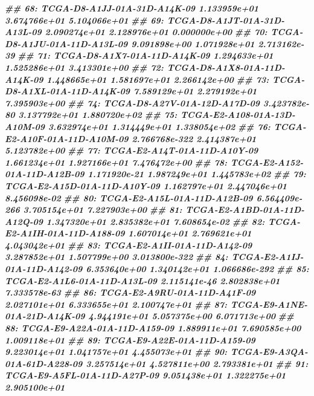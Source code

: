 \documentclass[
  12pt,
  a4paper,
  twoside]{book}
\newenvironment{Shaded}{\begin{snugshade}}{\end{snugshade}}
\newcommand{\DocumentationTok}[1]{\textcolor[rgb]{0.56,0.35,0.01}{\textbf{\textit{#1}}}}
\begin{document}
\begin{Shaded}
\begin{Highlighting}[]
\DocumentationTok{\#\#  68: TCGA{-}D8{-}A1JJ{-}01A{-}31D{-}A14K{-}09  1.133959e+01  3.674766e+01  5.104066e+01}
\DocumentationTok{\#\#  69: TCGA{-}D8{-}A1JT{-}01A{-}31D{-}A13L{-}09  2.090274e+01  2.128976e+01  0.000000e+00}
\DocumentationTok{\#\#  70: TCGA{-}D8{-}A1JU{-}01A{-}11D{-}A13L{-}09  9.091898e+00  1.071928e+01  2.713162e{-}39}
\DocumentationTok{\#\#  71: TCGA{-}D8{-}A1X7{-}01A{-}11D{-}A14K{-}09  1.294633e+01  1.525286e+01  3.413301e+00}
\DocumentationTok{\#\#  72: TCGA{-}D8{-}A1X8{-}01A{-}11D{-}A14K{-}09  1.448665e+01  1.581697e+01  2.266142e+00}
\DocumentationTok{\#\#  73: TCGA{-}D8{-}A1XL{-}01A{-}11D{-}A14K{-}09  7.589129e+01  2.279192e+01  7.395903e+00}
\DocumentationTok{\#\#  74: TCGA{-}D8{-}A27V{-}01A{-}12D{-}A17D{-}09  3.423782e{-}80  3.137792e+01  1.880720e+02}
\DocumentationTok{\#\#  75: TCGA{-}E2{-}A108{-}01A{-}13D{-}A10M{-}09  3.632974e+01  1.314449e+01  1.338054e+02}
\DocumentationTok{\#\#  76: TCGA{-}E2{-}A10F{-}01A{-}11D{-}A10M{-}09 2.766768e{-}322  2.414387e+01  5.123782e+00}
\DocumentationTok{\#\#  77: TCGA{-}E2{-}A14T{-}01A{-}11D{-}A10Y{-}09  1.661234e+01  1.927166e+01  7.476472e+00}
\DocumentationTok{\#\#  78: TCGA{-}E2{-}A152{-}01A{-}11D{-}A12B{-}09  1.171920e{-}21  1.987249e+01  1.445783e+02}
\DocumentationTok{\#\#  79: TCGA{-}E2{-}A15D{-}01A{-}11D{-}A10Y{-}09  1.162797e+01  2.447046e+01  8.456098e{-}02}
\DocumentationTok{\#\#  80: TCGA{-}E2{-}A15L{-}01A{-}11D{-}A12B{-}09 6.564409e{-}266  3.705154e+01  7.227903e+00}
\DocumentationTok{\#\#  81: TCGA{-}E2{-}A1BD{-}01A{-}11D{-}A12Q{-}09  1.347320e+01  2.835382e+01  7.608654e{-}02}
\DocumentationTok{\#\#  82: TCGA{-}E2{-}A1IH{-}01A{-}11D{-}A188{-}09  1.607014e+01  2.769621e+01  4.043042e+01}
\DocumentationTok{\#\#  83: TCGA{-}E2{-}A1II{-}01A{-}11D{-}A142{-}09  3.287852e+01  1.507799e+00 3.013800e{-}322}
\DocumentationTok{\#\#  84: TCGA{-}E2{-}A1IJ{-}01A{-}11D{-}A142{-}09  6.353640e+00  1.340142e+01 1.066686e{-}292}
\DocumentationTok{\#\#  85: TCGA{-}E2{-}A1L6{-}01A{-}11D{-}A13L{-}09  2.115141e{-}46  2.802838e+01  7.333578e{-}63}
\DocumentationTok{\#\#  86: TCGA{-}E2{-}A9RU{-}01A{-}11D{-}A41F{-}09  2.027101e+01  6.333655e+01  2.100747e+01}
\DocumentationTok{\#\#  87: TCGA{-}E9{-}A1NE{-}01A{-}21D{-}A14K{-}09  4.944191e+01  5.057375e+00  6.071713e+00}
\DocumentationTok{\#\#  88: TCGA{-}E9{-}A22A{-}01A{-}11D{-}A159{-}09  1.889911e+01  7.690585e+00  1.009118e+01}
\DocumentationTok{\#\#  89: TCGA{-}E9{-}A22E{-}01A{-}11D{-}A159{-}09  9.223014e+01  1.041757e+01  4.455073e+01}
\DocumentationTok{\#\#  90: TCGA{-}E9{-}A3QA{-}01A{-}61D{-}A228{-}09  3.257514e+01  4.527811e+00  2.793381e+01}
\DocumentationTok{\#\#  91: TCGA{-}E9{-}A5FL{-}01A{-}11D{-}A27P{-}09  9.051438e+01  1.322275e+01  2.905100e+01}

\end{Highlighting}
\end{Shaded}
\end{document}
